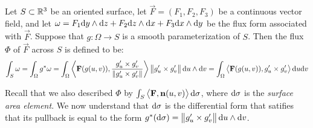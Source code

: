 \documentclass[11pt,a4paper]{article}
\begin{document}
\begin{definition}[Flux]
  Let $S \subset \mathbb{R}^3$ be an oriented surface,
  let $\vec F = (F_1,F_2,F_3)$ be a continuous vector field,
  and let
  $\omega = F_1 \dy \wedge \dz + F_2 \dz \wedge \dx + F_3 \dx \wedge \dy$
  be the flux form associated with $\vec F$.
  Suppose that $g \colon \Omega \to S$ is a smooth parameterization of $S$.
  Then the flux $\Phi$ of $\vec F$ across $S$ is defined to be:
  \[
    \int_{S} \omega =
    \int_{\Omega} g^*\omega =
    \int_{\Omega} \left\langle \boldsymbol{\mathbf{F}}(g(u,v)), \frac{g'_u \times g'_v}{\left\lVert g'_u \times g'_v\right\rVert} \right\rangle \left\lVert g'_u \times g'_v\right\rVert \mathrm{d} u \wedge \mathrm{d} v =
    \int_{\Omega} \left\langle 
    \boldsymbol{\mathbf{F}}(g(u,v)), g'_u \times g'_v \right\rangle \mathrm{d} u \mathrm{d} v
  \]
\end{definition}

\begin{remark}
  \label{rmk:surface-area-element-pullback-discovery}
  Recall that we also described $\Phi$
  by $\int_{S} \left\langle \boldsymbol{\mathbf{F}}, \boldsymbol{\mathbf{n}}(u,v) \right\rangle \mathrm{d} \sigma$,
  where $\mathrm{d} \sigma$ is the \textit{surface area element}.
  We now understand that $\mathrm{d} \sigma$ is the differential
  form that satifies that its pullback is equal to the form
  $g^*(\mathrm{d} \sigma) = \left\lVert g'_u \times g'_v\right\rVert \mathrm{d} u \wedge \mathrm{d} v$.
\end{remark}
\end{document}
